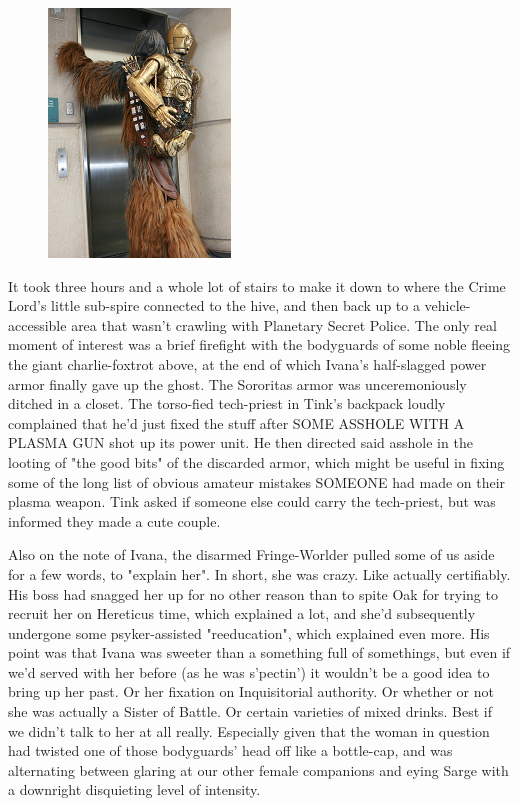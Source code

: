 \begin{figure}
	\begin{center}
		\includegraphics[width=\figwidth]{pics/19/7.png}
	\end{center}
\end{figure}
It took three hours and a whole lot of stairs to make it down to where the Crime Lord's little sub-spire connected to the hive, and then back up to a vehicle-accessible area that wasn't crawling with Planetary Secret Police. 
The only real moment of interest was a brief firefight with the bodyguards of some noble fleeing the giant charlie-foxtrot above, at the end of which Ivana's half-slagged power armor finally gave up the ghost. 
The Sororitas armor was unceremoniously ditched in a closet. 
The torso-fied tech-priest in Tink's backpack loudly complained that he'd just fixed the stuff after SOME ASSHOLE WITH A PLASMA GUN shot up its power unit. 
He then directed said asshole in the looting of "the good bits" of the discarded armor, which might be useful in fixing some of the long list of obvious amateur mistakes SOMEONE had made on their plasma weapon. 
Tink asked if someone else could carry the tech-priest, but was informed they made a cute couple.

Also on the note of Ivana, the disarmed Fringe-Worlder pulled some of us aside for a few words, to "explain her". 
In short, she was crazy. 
Like actually certifiably. 
His boss had snagged her up for no other reason than to spite Oak for trying to recruit her on Hereticus time, which explained a lot, and she'd subsequently undergone some psyker-assisted "reeducation", which explained even more. 
His point was that Ivana was sweeter than a something full of somethings, but even if we'd served with her before (as he was s'pectin') it wouldn't be a good idea to bring up her past. 
Or her fixation on Inquisitorial authority. 
Or whether or not she was actually a Sister of Battle. 
Or certain varieties of mixed drinks. 
Best if we didn't talk to her at all really. 
Especially given that the woman in question had twisted one of those bodyguards' head off like a bottle-cap, and was alternating between glaring at our other female companions and eying Sarge with a downright disquieting level of intensity.


